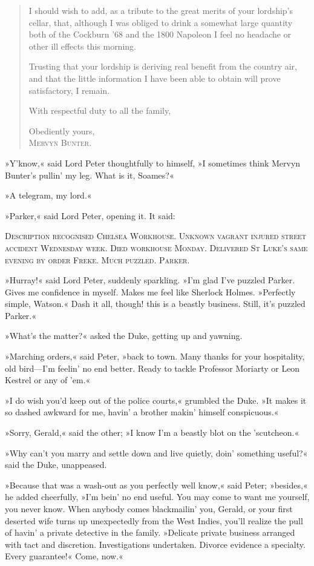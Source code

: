 \begin{quotation}
I should wish to add, as a tribute to the great merits of your lordship's cellar, that, although I was obliged to drink a somewhat large quantity both of the Cockburn '68 and the 1800 Napoleon I feel no headache or other ill effects this morning.

Trusting that your lordship is deriving real benefit from the country air, and that the little information I have been able to obtain will prove satisfactory, I remain.

With respectful duty to all the family,

\begin{flushright}
Obediently yours,\\
\textsc{Mervyn Bunter.}
\end{flushright}
\end{quotation}

»Y'know,« said Lord Peter thoughtfully to himself, »I sometimes think Mervyn Bunter's pullin' my leg. What is it, Soames?«

»A telegram, my lord.«

»Parker,« said Lord Peter, opening it. It said:

\textsc{Description recognised Chelsea Workhouse. Unknown vagrant injured street accident Wednesday week. Died workhouse Monday. Delivered St Luke's same evening by order Freke. Much puzzled. Parker.}

»Hurray!« said Lord Peter, suddenly sparkling. »I'm glad I've puzzled Parker. Gives me confidence in myself. Makes me feel like Sherlock Holmes. »Perfectly simple, Watson.« Dash it all, though! this is a beastly business. Still, it's puzzled Parker.«

»What's the matter?« asked the Duke, getting up and yawning.

»Marching orders,« said Peter, »back to town. Many thanks for your hospitality, old bird\allowbreak---\allowbreak I'm feelin' no end better. Ready to tackle Professor Moriarty or Leon Kestrel or any of 'em.«

»I do wish you'd keep out of the police courts,« grumbled the Duke. »It makes it so dashed awkward for me, havin' a brother makin' himself conspicuous.«

»Sorry, Gerald,« said the other; »I know I'm a beastly blot on the 'scutcheon.«

»Why can't you marry and settle down and live quietly, doin' something useful?« said the Duke, unappeased.

»Because that was a wash-out as you perfectly well know,« said Peter; »besides,« he added cheerfully, »I'm bein' no end useful. You may come to want me yourself, you never know. When anybody comes blackmailin' you, Gerald, or your first deserted wife turns up unexpectedly from the West Indies, you'll realize the pull of havin' a private detective in the family. »Delicate private business arranged with tact and discretion. Investigations undertaken. Divorce evidence a specialty. Every guarantee!« Come, now.«

